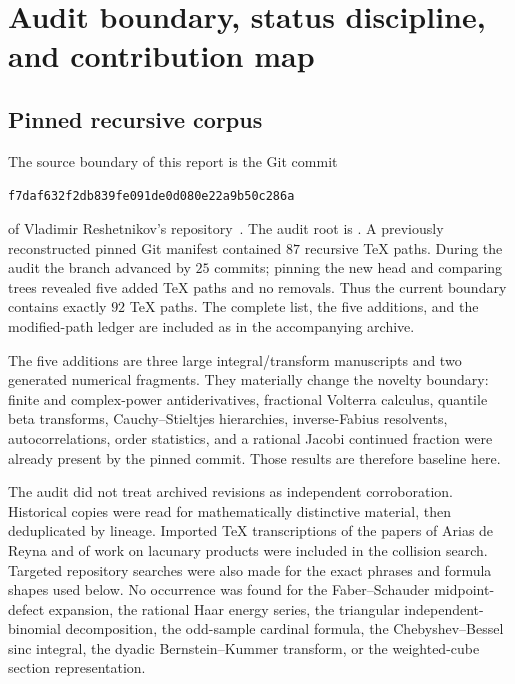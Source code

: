\documentclass[11pt]{article}
\theoremstyle{definition}
\theoremstyle{remark}
\begin{document}
\clearpage

\section{Audit boundary, status discipline, and contribution map}
\label{p8:sec:audit}

\subsection{Pinned recursive corpus}

The source boundary of this report is the Git commit
\begin{center}
\nolinkurl{f7daf632f2db839fe091de0d080e22a9b50c286a}
\end{center}
of Vladimir Reshetnikov's \repo{} repository~\cite{p8:proveit}.  The audit root is
.  A previously reconstructed pinned Git
manifest contained $87$ recursive TeX paths.  During the audit the branch
advanced by $25$ commits; pinning the new head and comparing trees revealed
five added TeX paths and no removals.  Thus the current boundary contains
exactly $92$ TeX paths.  The complete list, the five additions, and the
modified-path ledger are included as
 in the accompanying archive.

The five additions are three large integral/transform manuscripts and two
generated numerical fragments.  They materially change the novelty boundary:
finite and complex-power antiderivatives, fractional Volterra calculus,
quantile beta transforms, Cauchy--Stieltjes hierarchies, inverse-Fabius
resolvents, autocorrelations, order statistics, and a rational Jacobi
continued fraction were already present by the pinned commit.  Those results
are therefore baseline here.

The audit did not treat archived revisions as independent corroboration.
Historical copies were read for mathematically distinctive material, then
deduplicated by lineage.  Imported TeX transcriptions of the papers of Arias
de Reyna and of work on lacunary products were included in the collision
search.  Targeted repository searches were also made for the exact phrases
and formula shapes used below.  No occurrence was found for the Faber--Schauder
midpoint-defect expansion, the rational Haar energy series, the triangular
independent-binomial decomposition, the odd-sample cardinal formula, the
Chebyshev--Bessel sinc integral, the dyadic Bernstein--Kummer transform, or the
weighted-cube section representation.
\end{document}
